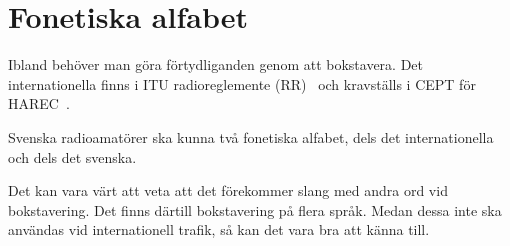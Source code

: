 \newpage
\section{Fonetiska alfabet}
\label{fonetiska_alfabet}

Ibland behöver man göra förtydliganden genom att bokstavera.
Det internationella finns i ITU radioreglemente (RR)~\cite[Appendix 14]{ITU-RR}
och kravställs i CEPT för HAREC~\cite[Annex 6]{TR6102}.

Svenska radioamatörer ska kunna två fonetiska alfabet, dels det
internationella och dels det svenska.

Det kan vara värt att veta att det förekommer slang med andra ord vid
bokstavering.
Det finns därtill bokstavering på flera språk.
Medan dessa inte ska användas vid internationell trafik, så kan det vara bra
att känna till.

